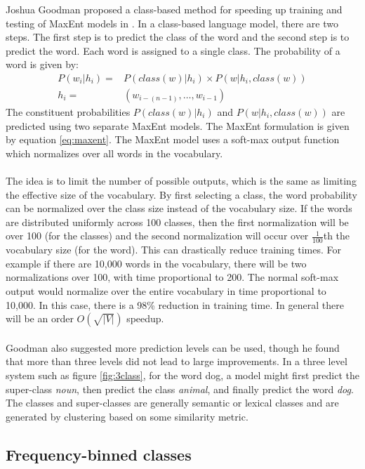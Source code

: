 Joshua Goodman proposed a class-based method for speeding up training and testing of MaxEnt models in \cite{Goodman2001}. In a class-based language model, there are two steps. The first step is to predict the class of the word and the second step is to predict the word. Each word is assigned to a single class. 
The probability of a word is given by:
\begin{align}
P(w_i | h_i)  =&  P(class(w) | h_i) \times P(w|  h_i, class(w))
\\ h_i =& ( w_{i-(n-1)},\dots, w_{i-1} ) \nonumber
\end{align}
The constituent probabilities $P(class(w) | h_i)$ and $P(w|  h_i, class(w))$ are predicted using two separate MaxEnt models. The MaxEnt formulation is given by equation \ref{eq:maxent}. The MaxEnt model uses a soft-max output function which normalizes over all words in the vocabulary.
\paragraph{}
The idea is to limit the number of possible outputs, which is the same as limiting the effective size of the vocabulary. By first selecting a class, the word probability can be normalized over the class size instead of the vocabulary size. If the words are distributed uniformly across 100 classes, then the first normalization will be over 100 (for the classes) and the second normalization will occur over $\frac{1}{100}$th the vocabulary size (for the word). This can drastically reduce training times. For example if there are 10,000 words in the vocabulary, there will be two normalizations over 100, with time proportional to 200. The normal soft-max output would normalize over the entire vocabulary in time proportional to 10,000. In this case, there is a 98\% reduction in training time. In general there will be an order $O(\sqrt{|V|})$ speedup.
\paragraph{}
Goodman also suggested more prediction levels can be used, though he found that more than three levels did not lead to large improvements. In a three level system such as figure \ref{fig:3class}, for the word dog, a model might first predict the super-class \emph{noun}, then predict the class \emph{animal}, and finally predict the word \emph{dog}. The classes and super-classes are generally semantic or lexical classes and are generated by clustering based on some similarity metric.
\subsection{Frequency-binned classes} \label{sec:frequencybinning}
